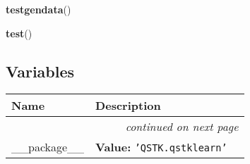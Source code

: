 \hspace{.8\funcindent}\begin{boxedminipage}{\funcwidth}

    \raggedright \textbf{testgendata}()

\setlength{\parskip}{2ex}
\setlength{\parskip}{1ex}
    \end{boxedminipage}

    \label{QSTK:qstklearn:fastknn:test}

    \vspace{0.5ex}

\hspace{.8\funcindent}\begin{boxedminipage}{\funcwidth}

    \raggedright \textbf{test}()

\setlength{\parskip}{2ex}
\setlength{\parskip}{1ex}
    \end{boxedminipage}



  \subsection{Variables}

    \vspace{-1cm}
\hspace{\varindent}\begin{longtable}{|p{\varnamewidth}|p{\vardescrwidth}|l}
\cline{1-2}
\cline{1-2} \centering \textbf{Name} & \centering \textbf{Description}& \\
\cline{1-2}
\endhead\cline{1-2}\multicolumn{3}{r}{\small\textit{continued on next page}}\\\endfoot\cline{1-2}
\endlastfoot\raggedright \_\-\_\-p\-a\-c\-k\-a\-g\-e\-\_\-\_\- & \raggedright \textbf{Value:} 
{\tt \texttt{'}\texttt{QSTK.qstklearn}\texttt{'}}&\\
\cline{1-2}
\end{longtable}



